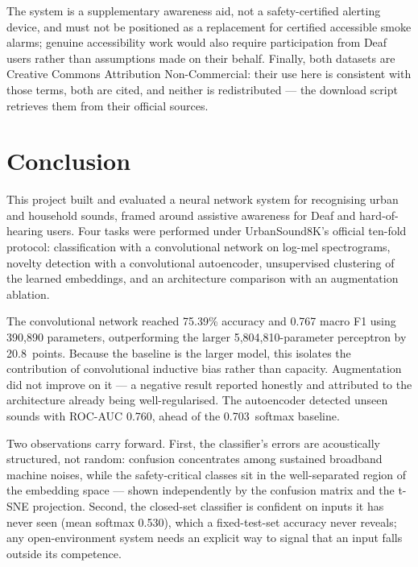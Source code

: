 \documentclass[11pt, a4paper]{article}
\newcommand{\cnnAcc}{75.39}
\newcommand{\cnnFone}{0.767}
\newcommand{\cnnVsMlp}{20.8}
\newcommand{\mlpParams}{5{,}804{,}810}
\newcommand{\cnnParams}{390{,}890}
\newcommand{\aeAUC}{0.760}
\newcommand{\softmaxAUC}{0.703}
\newcommand{\novelConf}{0.530}
\begin{document}
The system is a supplementary awareness aid, not a safety-certified alerting device, and must not be positioned as a replacement for certified accessible smoke alarms; genuine accessibility work would also require participation from Deaf users rather than assumptions made on their behalf. Finally, both datasets are Creative Commons Attribution Non-Commercial: their use here is consistent with those terms, both are cited, and neither is redistributed --- the download script retrieves them from their official sources.

\section{Conclusion}
\label{sec:conclusion}

This project built and evaluated a neural network system for recognising urban and household sounds, framed around assistive awareness for Deaf and hard-of-hearing users. Four tasks were performed under UrbanSound8K's official ten-fold protocol: classification with a convolutional network on log-mel spectrograms, novelty detection with a convolutional autoencoder, unsupervised clustering of the learned embeddings, and an architecture comparison with an augmentation ablation.

The convolutional network reached \cnnAcc\% accuracy and \cnnFone{} macro F1 using \cnnParams{} parameters, outperforming the larger \mlpParams-parameter perceptron by \cnnVsMlp\ points. Because the baseline is the larger model, this isolates the contribution of convolutional inductive bias rather than capacity. Augmentation did not improve on it --- a negative result reported honestly and attributed to the architecture already being well-regularised. The autoencoder detected unseen sounds with ROC-AUC \aeAUC, ahead of the \softmaxAUC\ softmax baseline.

Two observations carry forward. First, the classifier's errors are acoustically structured, not random: confusion concentrates among sustained broadband machine noises, while the safety-critical classes sit in the well-separated region of the embedding space --- shown independently by the confusion matrix and the t-SNE projection. Second, the closed-set classifier is confident on inputs it has never seen (mean softmax \novelConf), which a fixed-test-set accuracy never reveals; any open-environment system needs an explicit way to signal that an input falls outside its competence.
\end{document}
